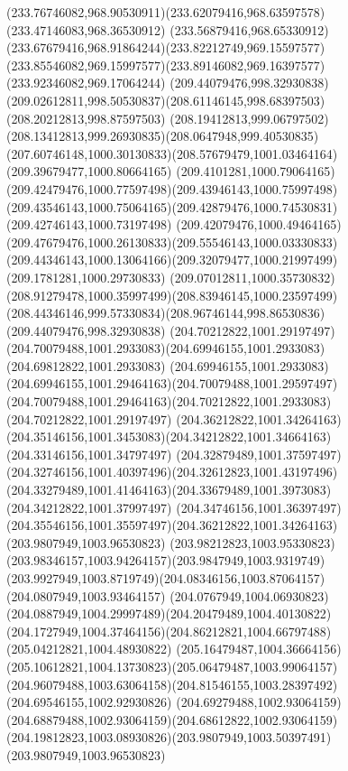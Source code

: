 {{  \curveto(233.76746082,968.90530911)(233.62079416,968.63597578)(233.47146083,968.36530912)
  \curveto(233.56879416,968.65330912)(233.67679416,968.91864244)(233.82212749,969.15597577)
  \curveto(233.85546082,969.15997577)(233.89146082,969.16397577)(233.92346082,969.17064244)
  \moveto(209.44079476,998.32930838)
  \curveto(209.02612811,998.50530837)(208.61146145,998.68397503)(208.20212813,998.87597503)
  \curveto(208.19412813,999.06797502)(208.13412813,999.26930835)(208.0647948,999.40530835)
  \curveto(207.60746148,1000.30130833)(208.57679479,1001.03464164)(209.39679477,1000.80664165)
  \curveto(209.4101281,1000.79064165)(209.42479476,1000.77597498)(209.43946143,1000.75997498)
  \curveto(209.43546143,1000.75064165)(209.42879476,1000.74530831)(209.42746143,1000.73197498)
  \curveto(209.42079476,1000.49464165)(209.47679476,1000.26130833)(209.55546143,1000.03330833)
  \curveto(209.44346143,1000.13064166)(209.32079477,1000.21997499)(209.1781281,1000.29730833)
  \curveto(209.07012811,1000.35730832)(208.91279478,1000.35997499)(208.83946145,1000.23597499)
  \curveto(208.44346146,999.57330834)(208.96746144,998.86530836)(209.44079476,998.32930838)
  \moveto(204.70212822,1001.29197497)
  \curveto(204.70079488,1001.2933083)(204.69946155,1001.2933083)(204.69812822,1001.2933083)
  \curveto(204.69946155,1001.2933083)(204.69946155,1001.29464163)(204.70079488,1001.29597497)
  \curveto(204.70079488,1001.29464163)(204.70212822,1001.2933083)(204.70212822,1001.29197497)
  \moveto(204.36212822,1001.34264163)
  \curveto(204.35146156,1001.3453083)(204.34212822,1001.34664163)(204.33146156,1001.34797497)
  \curveto(204.32879489,1001.37597497)(204.32746156,1001.40397496)(204.32612823,1001.43197496)
  \curveto(204.33279489,1001.41464163)(204.33679489,1001.3973083)(204.34212822,1001.37997497)
  \curveto(204.34746156,1001.36397497)(204.35546156,1001.35597497)(204.36212822,1001.34264163)
  \moveto(203.9807949,1003.96530823)
  \curveto(203.98212823,1003.95330823)(203.98346157,1003.94264157)(203.9847949,1003.9319749)
  \curveto(203.9927949,1003.8719749)(204.08346156,1003.87064157)(204.0807949,1003.93464157)
  \curveto(204.0767949,1004.06930823)(204.0887949,1004.29997489)(204.20479489,1004.40130822)
  \curveto(204.1727949,1004.37464156)(204.86212821,1004.66797488)(205.04212821,1004.48930822)
  \curveto(205.16479487,1004.36664156)(205.10612821,1004.13730823)(205.06479487,1003.99064157)
  \curveto(204.96079488,1003.63064158)(204.81546155,1003.28397492)(204.69546155,1002.92930826)
  \curveto(204.69279488,1002.93064159)(204.68879488,1002.93064159)(204.68612822,1002.93064159)
  \curveto(204.19812823,1003.08930826)(203.9807949,1003.50397491)(203.9807949,1003.96530823)
}}

